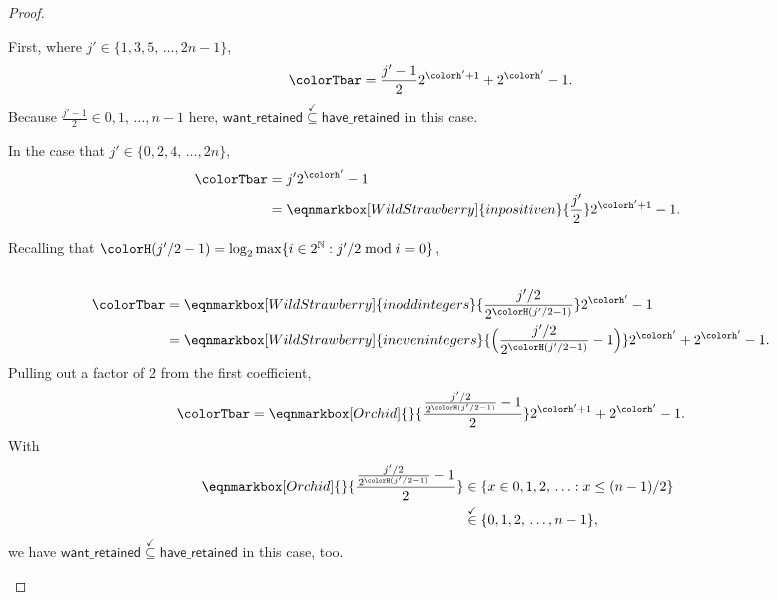 \begin{proof}
\begin{proofpart}
First, where $j' \in \{1,3,5,\,\ldots,2n-1\}$,
\begin{align*}
\colorTbar
&= \frac{j'-1}{2} 2^{\colorh' + 1} + 2^{\colorh'} - 1.
\end{align*}
Because $\frac{j'-1}{2} \in 0, 1, \, \ldots, n - 1$ here, $\mathsf{want\_retained} \stackrel{\checkmark}{\subseteq} \mathsf{have\_retained}$ in this case.

In the case that $j' \in \{0,2,4,\,\ldots,2n\}$,
\begin{align*}
\colorTbar
&= j'2^{\colorh'} - 1\\
&=
\eqnmarkbox[WildStrawberry]{inpositiven}{
  \frac{j'}{2}
}2^{\colorh' + 1} - 1.
\end{align*}

Recalling that $\colorH(j'/2 - 1) = \log_2 \max\{ i \in 2^{\mathbb{N}} : j'/2 \bmod i = 0 \}$,
\begin{align*}
\\
\colorTbar
&=
\eqnmarkbox[WildStrawberry]{inoddintegers}{
  \frac{j'/2}{2^{\colorH(j'/2 - 1)}}
}
2^{\colorh'} - 1\\
&=
\eqnmarkbox[WildStrawberry]{inevenintegers}{
  \Big(\frac{j'/2}{2^{\colorH(j'/2 - 1)}} - 1\Big)
}
2^{\colorh'} + 2^{\colorh'} - 1.\\
\end{align*}
Pulling out a factor of 2 from the first coefficient,
\begin{align*}
  \colorTbar
  &=
  \eqnmarkbox[Orchid]{}{
  \frac{
    \frac{j'/2}{2^{\colorH(j'/2 - 1)}} - 1
  }{2}
  }
2^{\colorh' + 1} + 2^{\colorh'} - 1.
\end{align*}
With
\begin{align*}
  \eqnmarkbox[Orchid]{}{
  \frac{
    \frac{j'/2}{2^{\colorH(j'/2 - 1)}} - 1
  }{2}
  }
  &\in \{x \in 0,1,2,\,\ldots: x \leq (n-1)/2\}\\
  &\stackrel{\checkmark}{\in} \{0,1,2,\,\ldots,n-1\},
\end{align*}
we have $\mathsf{want\_retained} \stackrel{\checkmark}{\subseteq} \mathsf{have\_retained}$ in this case, too.
\end{proofpart}
\end{proof}

